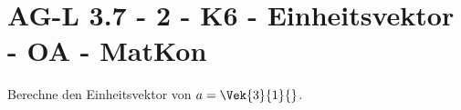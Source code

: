 \section{AG-L 3.7 - 2 - K6 - Einheitsvektor - OA - MatKon}

\begin{beispiel}[AG-L 3.7]{1}
Berechne den Einheitsvektor von $a=\Vek{3}{1}{}$.

\end{beispiel}